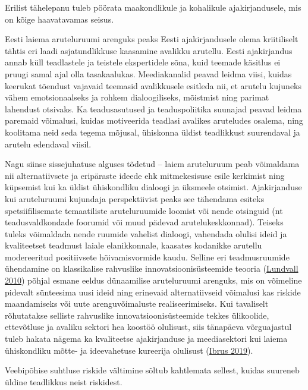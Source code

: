 \documentclass[estonian,]{article}
\begin{document}
\begin{blockquote-right}
Erilist tähelepanu tuleb pöörata maakondlikule ja kohalikule
ajakirjandusele, mis on kõige haavatavamas seisus.
\end{blockquote-right}

Eesti laiema aruteluruumi arenguks peaks Eesti ajakirjandusele olema kriitiliselt tähtis eri laadi asjatundlikkuse kaasamine avalikku arutellu. Eesti ajakirjandus annab küll teadlastele ja teistele ekspertidele sõna, kuid teemade käsitlus ei pruugi samal ajal olla tasakaalukas. Meediakanalid peavad leidma viisi, kuidas keerukat tõendust vajavaid teemasid avalikkusele esitleda nii, et arutelu kujuneks vähem emotsionaalseks ja rohkem dialoogiliseks, mõistmist ning parimat lahendust otsivaks. Ka teadusasutused ja teaduspoliitika suunajad peavad leidma paremaid võimalusi, kuidas motiveerida teadlasi avalikes aruteludes osalema, ning koolitama neid seda tegema mõjusal, ühiskonna üldist teadlikkust suurendaval ja arutelu edendaval viisil.

Nagu siinse sissejuhatuse alguses tõdetud -- laiem aruteluruum peab võimaldama nii alternatiivsete ja eripäraste ideede ehk mitmekesisuse esile kerkimist ning küpsemist kui ka üldist ühiskondliku dialoogi ja üksmeele otsimist. Ajakirjanduse kui aruteluruumi kujundaja perspektiivist peaks see tähendama esiteks spetsiifilisemate temaatiliste aruteluruumide loomist või nende otsinguid (nt teadusvaldkondade foorumid või muud pädevad arutelukeskkonnad). Teiseks tuleks võimaldada nende ruumide vahelist dialoogi, vahendada olulisi ideid ja kvaliteetset teadmust laiale elanikkonnale, kaasates kodanikke arutellu modereeritud positiivsete hõivamisvormide kaudu. Selline eri teadmusruumide ühendamine on klassikalise rahvuslike innovatsioonisüsteemide teooria (\protect\hyperlink{Lundvall2010}{Lundvall 2010}) põhjal esmane eeldus dünaamilise aruteluruumi arenguks, mis on võimeline pidevalt sünteesima uusi ideid ning erinevaid alternatiivseid võimalusi kas riskide maandamiseks või uute arenguvõimaluste realiseerimiseks. Kui tavaliselt rõhutatakse selliste rahvuslike innovatsioonisüsteemide tekkes ülikoolide, ettevõtluse ja avaliku sektori hea koostöö olulisust, siis tänapäeva võrguajastul tuleb hakata nägema ka kvaliteetse ajakirjanduse ja meediasektori kui laiema ühiskondliku mõtte- ja ideevahetuse kureerija olulisust (\protect\hyperlink{Ibrus2019}{Ibrus 2019}).

\begin{blockquote-left}
Veebipõhise suhtluse riskide vältimine sõltub kahtlemata sellest, kuidas
suureneb üldine teadlikkus neist riskidest.
\end{blockquote-left}
\end{document}
